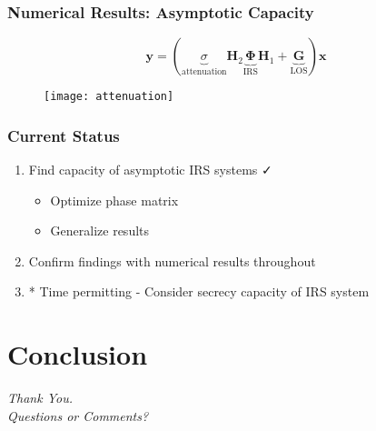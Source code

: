 \documentclass[10pt,tgadventor, onlymath]{beamer}
\begin{document}
\begin{frame}
	\frametitle{Numerical Results: Asymptotic Capacity}
		\begin{equation*}
	\mathbf{y} = (\underbrace{\sigma}_{\text{attenuation}}\mathbf{H}_2\underbrace{\boldsymbol{\Phi}}_{\text{IRS}}\mathbf{H}_1 + \underbrace{\mathbf{G}}_{\text{LOS}})\mathbf{x}
	\end{equation*} 
\begin{figure}
\texttt{[image: attenuation]}
\end{figure}
\end{frame}



\begin{frame}
\frametitle{Current Status}
\begin{enumerate}
\item
	Find capacity of asymptotic IRS systems  \faCheck
	\begin{itemize}
	\item 
		Optimize phase matrix	\faQuestion
	\item
		Generalize results
	\end{itemize}

\item 
	Confirm findings with numerical results throughout
	
\item
	* Time permitting - Consider secrecy capacity of IRS system
\end{enumerate}
\end{frame}


\section{Conclusion}

\begin{frame}
  \centering \Large
  \emph{Thank You.}
  \\
	\bigskip
    \centering \Large
  \emph{Questions or Comments?}

\end{frame}
\end{document}
